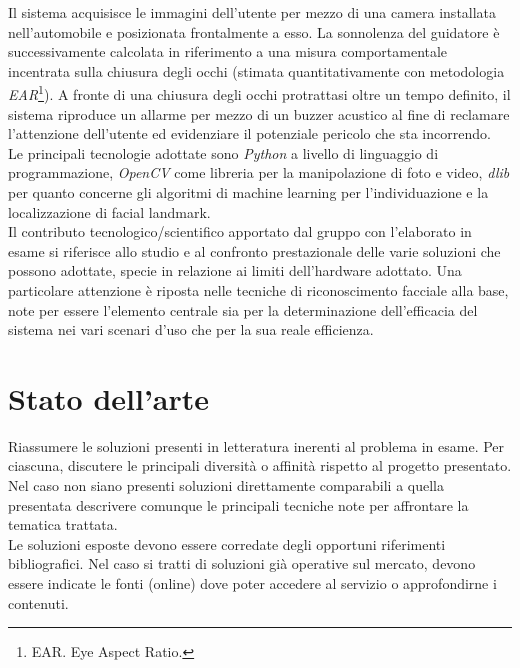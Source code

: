 \documentclass[12pt]{article}
\begin{document}
Il sistema acquisisce le immagini dell'utente per mezzo di una camera installata nell'automobile e posizionata frontalmente a esso. La sonnolenza del guidatore è successivamente calcolata in riferimento a una misura comportamentale incentrata sulla chiusura degli occhi (stimata quantitativamente con metodologia \textit{EAR}\footnote{EAR. Eye Aspect Ratio.}\cite{EAR}). A fronte di una chiusura degli occhi protrattasi oltre un tempo definito, il sistema riproduce un allarme per mezzo di un buzzer acustico al fine di reclamare l'attenzione dell'utente ed evidenziare il potenziale pericolo che sta incorrendo.\\
Le principali tecnologie adottate sono \textit{Python} a livello di linguaggio di programmazione, \textit{OpenCV} come libreria per la manipolazione di foto e video, \textit{dlib} per quanto concerne gli algoritmi di machine learning per l'individuazione e la localizzazione di facial landmark.\\
Il contributo tecnologico/scientifico apportato dal gruppo con l'elaborato in esame si riferisce allo studio e al confronto prestazionale delle varie soluzioni che possono adottate, specie in relazione ai limiti dell'hardware adottato. Una particolare attenzione è riposta nelle tecniche di riconoscimento facciale alla base, note per essere l'elemento centrale sia per la determinazione dell'efficacia del sistema nei vari scenari d'uso che per la sua reale efficienza.

\newpage



\section{Stato dell'arte}

Riassumere le soluzioni presenti in letteratura inerenti al problema in esame. Per ciascuna, discutere le principali diversità o affinità rispetto al progetto presentato. Nel caso non siano presenti soluzioni direttamente comparabili a quella presentata descrivere comunque le principali tecniche note per affrontare la tematica trattata.\\

Le soluzioni esposte devono essere corredate degli opportuni riferimenti bibliografici. Nel caso si tratti di soluzioni già operative sul mercato, devono essere indicate le fonti (online) dove poter accedere al servizio o approfondirne i contenuti.\\
\end{document}
